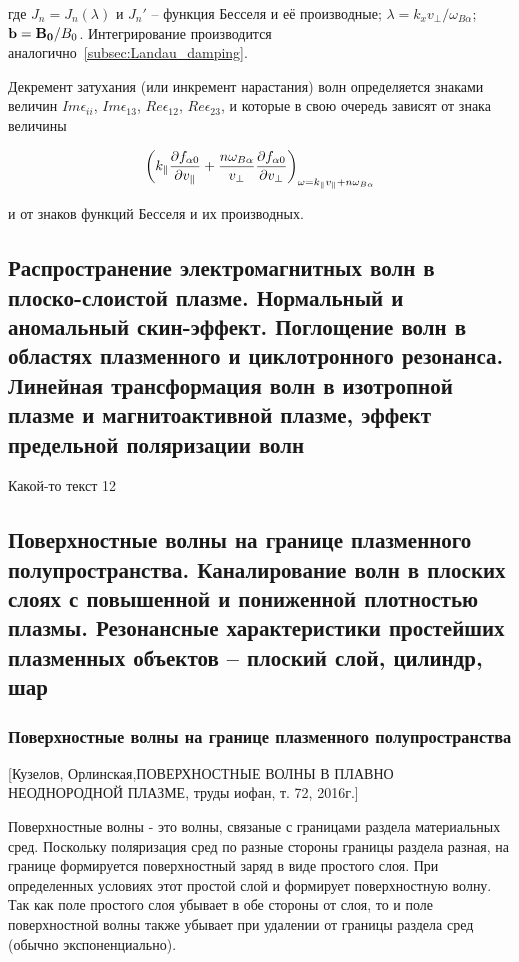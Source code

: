 \documentclass[10pt, a4paper]{article}
\begin{document}
где $J_n = J_n(\lambda)$ и $J_n'$ -- функция Бесселя и её производные; $\lambda = k_xv_\perp/\omega_{B\alpha}$; $\vb{b}=\vb{B_0}/B_0$. Интегрирование производится аналогично~\ref{subsec:Landau_damping}.

Декремент затухания (или инкремент нарастания) волн определяется знаками величин $Im\epsilon_{ii}$, $Im\epsilon_{13}$, $Re\epsilon_{12}$, $Re\epsilon_{23}$, и которые в свою очередь зависят от знака величины

\begin{equation*}
	\left(k_\parallel\pdv{f_{\alpha 0}}{v_\parallel}+\frac{n\omega_{B\alpha}}{v_\perp}\pdv{f_{\alpha 0}}{v_\perp}\right)_{\omega=k_\parallel v_\parallel+n\omega_{B\alpha}} 
\end{equation*}

и от знаков функций Бесселя и их производных.

\subsection{Распространение электромагнитных волн в плоско-слоистой плазме. Нормальный и аномальный скин-эффект. Поглощение волн в областях плазменного и циклотронного резонанса. Линейная трансформация волн в изотропной плазме и магнитоактивной плазме, эффект предельной поляризации волн}

Какой-то текст 12

\subsection{Поверхностные волны на границе плазменного полупространства. Каналирование волн в плоских слоях с повышенной и пониженной плотностью плазмы. Резонансные характеристики простейших плазменных объектов – плоский слой, цилиндр, шар}

\subsubsection{Поверхностные волны на границе плазменного полупространства}
[Кузелов, Орлинская,ПОВЕРХНОСТНЫЕ ВОЛНЫ В ПЛАВНО НЕОДНОРОДНОЙ ПЛАЗМЕ, труды иофан, т. 72, 2016г.]%

Поверхностные волны - это волны, связаные с границами раздела материальных сред. Поскольку поляризация сред по разные стороны границы раздела разная, на границе формируется поверхностный заряд в виде простого слоя. При определенных условиях этот простой слой и формирует поверхностную волну. Так как поле простого слоя убывает в обе стороны от слоя, то и поле поверхностной волны также убывает при удалении от границы раздела сред (обычно экспоненциально).
\end{document}
